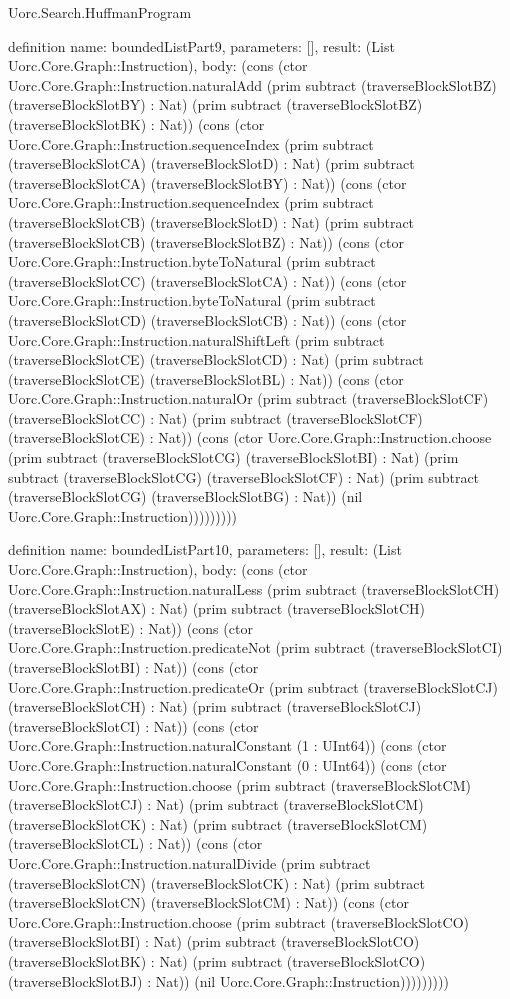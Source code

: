 \begin{lexlean}{Uorc.Search.HuffmanProgram}
\begin{semanticmodule}
definition{
  name: boundedListPart9,
  parameters: [],
  result: (List Uorc.Core.Graph::Instruction),
  body: (cons (ctor Uorc.Core.Graph::Instruction.naturalAdd (prim subtract (traverseBlockSlotBZ) (traverseBlockSlotBY) : Nat) (prim subtract (traverseBlockSlotBZ) (traverseBlockSlotBK) : Nat)) (cons (ctor Uorc.Core.Graph::Instruction.sequenceIndex (prim subtract (traverseBlockSlotCA) (traverseBlockSlotD) : Nat) (prim subtract (traverseBlockSlotCA) (traverseBlockSlotBY) : Nat)) (cons (ctor Uorc.Core.Graph::Instruction.sequenceIndex (prim subtract (traverseBlockSlotCB) (traverseBlockSlotD) : Nat) (prim subtract (traverseBlockSlotCB) (traverseBlockSlotBZ) : Nat)) (cons (ctor Uorc.Core.Graph::Instruction.byteToNatural (prim subtract (traverseBlockSlotCC) (traverseBlockSlotCA) : Nat)) (cons (ctor Uorc.Core.Graph::Instruction.byteToNatural (prim subtract (traverseBlockSlotCD) (traverseBlockSlotCB) : Nat)) (cons (ctor Uorc.Core.Graph::Instruction.naturalShiftLeft (prim subtract (traverseBlockSlotCE) (traverseBlockSlotCD) : Nat) (prim subtract (traverseBlockSlotCE) (traverseBlockSlotBL) : Nat)) (cons (ctor Uorc.Core.Graph::Instruction.naturalOr (prim subtract (traverseBlockSlotCF) (traverseBlockSlotCC) : Nat) (prim subtract (traverseBlockSlotCF) (traverseBlockSlotCE) : Nat)) (cons (ctor Uorc.Core.Graph::Instruction.choose (prim subtract (traverseBlockSlotCG) (traverseBlockSlotBI) : Nat) (prim subtract (traverseBlockSlotCG) (traverseBlockSlotCF) : Nat) (prim subtract (traverseBlockSlotCG) (traverseBlockSlotBG) : Nat)) (nil Uorc.Core.Graph::Instruction)))))))))
}

definition{
  name: boundedListPart10,
  parameters: [],
  result: (List Uorc.Core.Graph::Instruction),
  body: (cons (ctor Uorc.Core.Graph::Instruction.naturalLess (prim subtract (traverseBlockSlotCH) (traverseBlockSlotAX) : Nat) (prim subtract (traverseBlockSlotCH) (traverseBlockSlotE) : Nat)) (cons (ctor Uorc.Core.Graph::Instruction.predicateNot (prim subtract (traverseBlockSlotCI) (traverseBlockSlotBI) : Nat)) (cons (ctor Uorc.Core.Graph::Instruction.predicateOr (prim subtract (traverseBlockSlotCJ) (traverseBlockSlotCH) : Nat) (prim subtract (traverseBlockSlotCJ) (traverseBlockSlotCI) : Nat)) (cons (ctor Uorc.Core.Graph::Instruction.naturalConstant (1 : UInt64)) (cons (ctor Uorc.Core.Graph::Instruction.naturalConstant (0 : UInt64)) (cons (ctor Uorc.Core.Graph::Instruction.choose (prim subtract (traverseBlockSlotCM) (traverseBlockSlotCJ) : Nat) (prim subtract (traverseBlockSlotCM) (traverseBlockSlotCK) : Nat) (prim subtract (traverseBlockSlotCM) (traverseBlockSlotCL) : Nat)) (cons (ctor Uorc.Core.Graph::Instruction.naturalDivide (prim subtract (traverseBlockSlotCN) (traverseBlockSlotCK) : Nat) (prim subtract (traverseBlockSlotCN) (traverseBlockSlotCM) : Nat)) (cons (ctor Uorc.Core.Graph::Instruction.choose (prim subtract (traverseBlockSlotCO) (traverseBlockSlotBI) : Nat) (prim subtract (traverseBlockSlotCO) (traverseBlockSlotBK) : Nat) (prim subtract (traverseBlockSlotCO) (traverseBlockSlotBJ) : Nat)) (nil Uorc.Core.Graph::Instruction)))))))))
}


\end{semanticmodule}
\end{lexlean}

